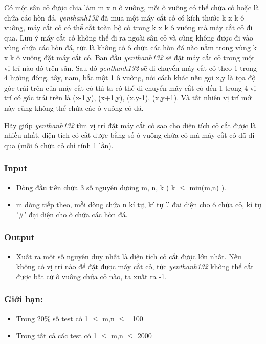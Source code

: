 



   Có một sân cỏ được chia làm m x n ô vuông, mỗi ô vuông có thể chứa cỏ hoặc là chứa các hòn đá.   \emph{    yenthanh132   }   đã mua một máy cắt cỏ có kích thước k x k ô vuông, máy cắt cỏ có thể cắt toàn bộ cỏ trong k x k ô vuông mà máy cắt cỏ đi qua. Lưu ý máy cắt cỏ không thể đi ra ngoài sân cỏ và cũng không được đi vào vùng chứa các hòn đá, tức là không có ô chứa các hòn đá nào nằm trong vùng k x k ô vuông đặt máy cắt cỏ. Ban đầu   \emph{    yenthanh132   }   sẽ đặt máy cắt cỏ trong một vị trí nào đó trên sân. Sau đó   \emph{    yenthanh132   }   sẽ di chuyển máy cắt cỏ theo 1 trong 4 hướng đông, tây, nam, bắc một 1 ô vuông, nói cách khác nếu gọi x,y là tọa độ góc trái trên của máy cắt cỏ thì ta có thể di chuyển máy cắt cỏ đến 1 trong 4 vị trí có góc trái trên là (x-1,y), (x+1,y), (x,y-1), (x,y+1). Và tất nhiên vị trí mới này cũng không thể chứa các ô vuông có đá.  

   Hãy giúp   \emph{    yenthanh132   }   tìm vị trí đặt máy cắt cỏ sao cho diện tích cỏ cắt được là nhiều nhất, diện tích có cắt được bằng số ô vuông chứa cỏ mà máy cắt cỏ đã đi qua (mỗi ô chứa cỏ chỉ tính 1 lần).  

\subsubsection{   Input  }
\begin{itemize}
	\item     Dòng đầu tiên chứa 3 số nguyên dương m, n, k ( k  $\le$  min(m,n) ).   
	\item     m dòng tiếp theo, mỗi dòng chứa n kí tự, kí tự '.' đại diện cho ô chứa cỏ, kí tự '\#' đại diện cho ô chứa các hòn đá.   
\end{itemize}

\subsubsection{   Output  }
\begin{itemize}
	\item     Xuất ra một số nguyên duy nhất là diện tích cỏ cắt được lớn nhất. Nếu không có vị trí nào để đặt được máy cắt cỏ, tức    \emph{     yenthanh132    }    không thể cắt được bất cứ ô vuông chứa cỏ nào, ta xuất ra -1.   
\end{itemize}

\subsubsection{   Giới hạn:  }
\begin{itemize}
	\item     Trong 20\% số test có 1  $\le$  m,n  $\le$  100   
	\item     Trong tất cả các test có 1  $\le$  m,n  $\le$  2000   
\end{itemize}

